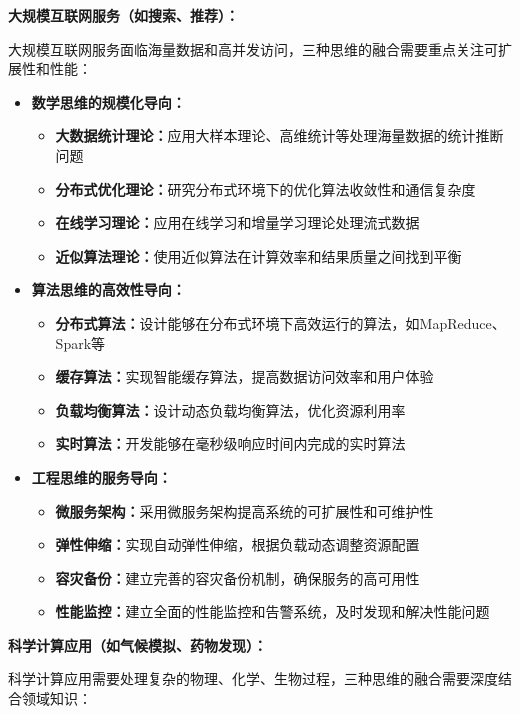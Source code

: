 \textbf{大规模互联网服务（如搜索、推荐）：}

大规模互联网服务面临海量数据和高并发访问，三种思维的融合需要重点关注可扩展性和性能：

\begin{itemize}
\item \textbf{数学思维的规模化导向：}
\begin{itemize}
\item \textbf{大数据统计理论：}应用大样本理论、高维统计等处理海量数据的统计推断问题
\item \textbf{分布式优化理论：}研究分布式环境下的优化算法收敛性和通信复杂度
\item \textbf{在线学习理论：}应用在线学习和增量学习理论处理流式数据
\item \textbf{近似算法理论：}使用近似算法在计算效率和结果质量之间找到平衡
\end{itemize}

\item \textbf{算法思维的高效性导向：}
\begin{itemize}
\item \textbf{分布式算法：}设计能够在分布式环境下高效运行的算法，如MapReduce、Spark等
\item \textbf{缓存算法：}实现智能缓存算法，提高数据访问效率和用户体验
\item \textbf{负载均衡算法：}设计动态负载均衡算法，优化资源利用率
\item \textbf{实时算法：}开发能够在毫秒级响应时间内完成的实时算法
\end{itemize}

\item \textbf{工程思维的服务导向：}
\begin{itemize}
\item \textbf{微服务架构：}采用微服务架构提高系统的可扩展性和可维护性
\item \textbf{弹性伸缩：}实现自动弹性伸缩，根据负载动态调整资源配置
\item \textbf{容灾备份：}建立完善的容灾备份机制，确保服务的高可用性
\item \textbf{性能监控：}建立全面的性能监控和告警系统，及时发现和解决性能问题
\end{itemize}
\end{itemize}

\textbf{科学计算应用（如气候模拟、药物发现）：}

科学计算应用需要处理复杂的物理、化学、生物过程，三种思维的融合需要深度结合领域知识：

